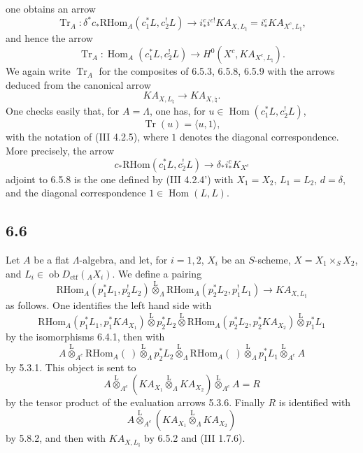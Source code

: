 \documentclass[11pt]{article}
\DeclareMathOperator{\Hom}{Hom}
\providecommand{\RHom}{\mathrm{RHom}}
\providecommand{\Tr}{\operatorname{Tr}}
\providecommand{\Tr}{\operatorname{Tr}}
\providecommand{\lten}{\overset{\mathrm L}{\otimes}}
\providecommand{\Ob}{\operatorname{ob}}
\providecommand{\Tr}{\operatorname{Tr}}
\providecommand{\RHom}{\mathrm{RHom}}
\providecommand{\Hom}{\operatorname{Hom}}
\providecommand{\lten}{\overset{\mathrm L}{\otimes}}
\providecommand{\RHom}{\mathrm R\mathcal{H}om}
\providecommand{\lten}{\overset{\mathrm L}{\otimes}}
\providecommand{\Ob}{\operatorname{ob}}
\providecommand{\Tr}{\operatorname{Tr}}
\providecommand{\lten}{\overset{\mathrm L}{\otimes}}
\providecommand{\lten}{\overset{\mathrm L}{\otimes}}
\providecommand{\Ob}{\operatorname{Ob}}
\providecommand{\lten}{\overset{\mathrm L}{\otimes}}
\providecommand{\RHom}{\mathrm{RHom}}
\begin{document}
one obtains an arrow
\begin{equation}
\Tr_A:\delta^*c_*\RHom_A(c_1^*L,c_2^!L)
\longrightarrow
i_*^ci^{c!}KA_{X,L_{\natural}}
=i_*^cKA_{X^c,L_{\natural}},
\tag{6.5.8}
\end{equation}
and hence the arrow
\begin{equation}
\Tr_A:\Hom_A(c_1^*L,c_2^!L)
\longrightarrow
H^0(X^c,KA_{X^c,L_{\natural}}).
\tag{6.5.9}
\end{equation}
We again write $\Tr_A$ for the composites of 6.5.3, 6.5.8, 6.5.9 with the arrows deduced from the canonical arrow
\[
KA_{X,L_{\natural}}\longrightarrow KA_{X,\natural}.
\]
One checks easily that, for $A=\Lambda$, one has, for $u\in\Hom(c_1^*L,c_2^!L)$,
\begin{equation}
\Tr(u)=\langle u,1\rangle,
\tag{6.5.10}
\end{equation}
with the notation of (III 4.2.5), where $1$ denotes the diagonal correspondence. More precisely, the arrow
\[
c_*\RHom(c_1^*L,c_2^!L)\longrightarrow \delta_*i_*^cK_{X^c}
\]
adjoint to 6.5.8 is the one defined by (III 4.2.4') with $X_1=X_2$, $L_1=L_2$, $d=\delta$, and the diagonal correspondence $1\in\Hom(L,L)$.

\subsection*{6.6}
Let $A$ be a flat $\Lambda$-algebra, and let, for $i=1,2$, $X_i$ be an $S$-scheme, $X=X_1\times_SX_2$, and $L_i\in\Ob D_{\mathrm{ctf}}({}_AX_i)$. We define a pairing
\begin{equation}
\RHom_A(p_1^*L_1,p_2^!L_2)
\lten_{\Lambda}
\RHom_A(p_2^*L_2,p_1^!L_1)
\longrightarrow
KA_{X,L_{\natural}}
\tag{6.6.1}
\end{equation}
as follows. One identifies the left hand side with
\[
\RHom_A(p_1^*L_1,p_1^*KA_{X_1})
\lten p_2^*L_2
\lten
\RHom_A(p_2^*L_2,p_2^*KA_{X_2})
\lten p_1^*L_1
\]
by the isomorphisms 6.4.1, then with
\[
A\lten_{A^e}\RHom_A(\ )\lten_{\Lambda}p_2^*L_2
 \lten_{\Lambda}\RHom_A(\ )\lten_{\Lambda}p_1^*L_1\lten_{A^e}A
\]
by 5.3.1. This object is sent to
\[
A\lten_{A^e}(KA_{X_1}\lten_{\Lambda}KA_{X_2})\lten_{A^e}A=R
\]
by the tensor product of the evaluation arrows 5.3.6. Finally $R$ is identified with
\[
A\lten_{A^e}(KA_{X_1}\lten_{\Lambda}KA_{X_2})
\]
by 5.8.2, and then with $KA_{X,L_{\natural}}$ by 6.5.2 and (III 1.7.6).
\end{document}

